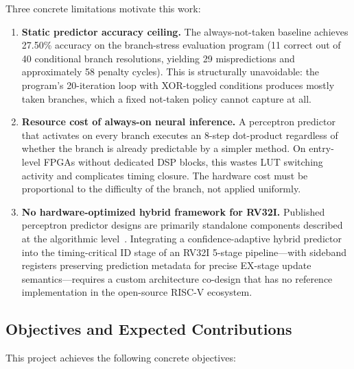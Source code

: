 \documentclass[12pt,a4paper]{article}
\begin{document}
Three concrete limitations motivate this work:

\begin{enumerate}
  \item \textbf{Static predictor accuracy ceiling.}
    The always-not-taken baseline achieves 27.50\% accuracy on the branch-stress
    evaluation program (11 correct out of 40 conditional branch resolutions,
    yielding 29 mispredictions and approximately 58 penalty cycles). This is
    structurally unavoidable: the program's 20-iteration loop with XOR-toggled
    conditions produces mostly taken branches, which a fixed not-taken policy
    cannot capture at all.

  \item \textbf{Resource cost of always-on neural inference.}
    A perceptron predictor that activates on every branch executes an 8-step
    dot-product regardless of whether the branch is already predictable by a
    simpler method. On entry-level FPGAs without dedicated DSP blocks, this
    wastes LUT switching activity and complicates timing closure. The hardware
    cost must be proportional to the difficulty of the branch, not applied
    uniformly.

  \item \textbf{No hardware-optimized hybrid framework for RV32I.}
    Published perceptron predictor designs are primarily standalone components
    described at the algorithmic level~\cite{jimenez2001perceptron,jimenez2003fast}.
    Integrating a confidence-adaptive hybrid predictor into the timing-critical
    ID stage of an RV32I 5-stage pipeline---with sideband registers preserving
    prediction metadata for precise EX-stage update semantics---requires a
    custom architecture co-design that has no reference implementation in the
    open-source RISC-V ecosystem.
\end{enumerate}

\subsection{Objectives and Expected Contributions}
\label{sec:objectives}

This project achieves the following concrete objectives:
\end{document}
